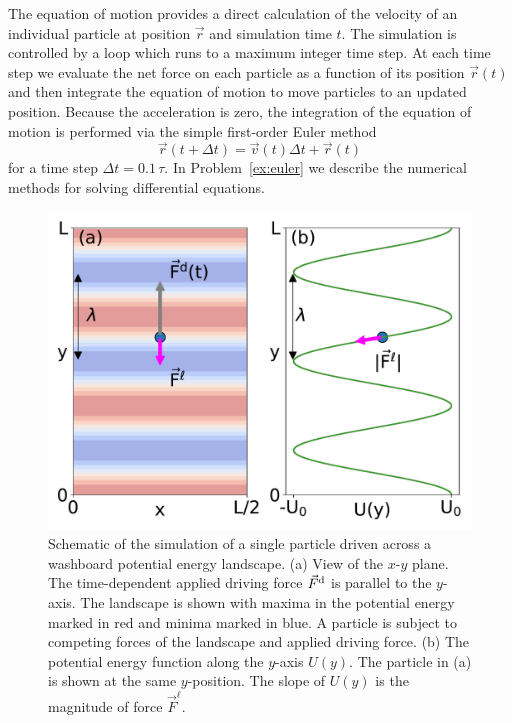 \documentclass[preprint,showpacs,preprintnumbers,amsmath,amssymb,aps,prb]{revtex4-1}
\theoremstyle{remark}
\begin{document}
The equation of motion provides a direct calculation of the velocity
of an individual particle at position $\vec{r}$ 
and simulation time $t$.
The   simulation is controlled by a  loop
which runs to a maximum integer time step.
At each time step
we evaluate the net force on each particle as a function of its position
$\vec{r}(t)$
and then integrate
the equation of motion to move particles
to an updated position.
Because the acceleration is zero,
the integration of the equation of motion
is performed via 
the simple first-order Euler method 
\begin{equation}
  \vec{r}(t+\Delta t) = \vec{v}(t) \Delta t + \vec{r}(t)
    \label{eq:euler}
\end{equation}
for a time step $\Delta t = 0.1\,\tau$.
In 
Problem~\ref{ex:euler}
we describe 
the numerical methods for 
solving differential equations.
\begin{figure} %
\centering
\includegraphics[width=\columnwidth]{fig1_landscape.pdf}
\caption{
Schematic of the simulation of a single particle
  driven across a washboard potential energy landscape.
  (a) View of the $x$-$y$ plane. 
  The time-dependent applied driving force $\vec{F}^{\rm d}$
  is parallel to the $y$-axis.
  The landscape is shown with 
  maxima in the potential energy marked in red
  and minima marked in blue.
  A particle is 
  subject to competing forces of the landscape and applied driving force.
  (b) The potential energy function
  along the $y$-axis $U(y)$.  %
  The particle in (a) is shown at the same $y$-position.
  The slope of $U(y)$ %
  is the 
  magnitude of force $\vec{F}^{\ell}$. 
  }
\label{fig:1_landscape}
\end{figure}
%
\end{document}
